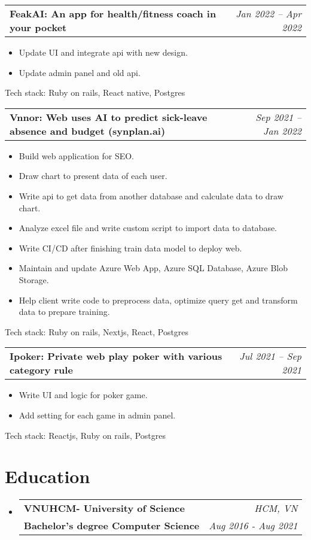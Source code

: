 \documentclass[letterpaper,11pt]{article}
\makeatletter
\newcommand{\resumeItem}[1]{
  \item\small{
    {#1 \vspace{-2pt}}
  }
}
\newcommand{\resumeSubheadingWithoutProject}[4]{
  \vspace{-2pt}\item
    \begin{tabular*}{0.97\textwidth}[t]{l@{\extracolsep{\fill}}r}
      \textbf{\Large#1} & \textit{#2} \\
      \textbf{\small#3} & \textit{\small #4} \\
    \end{tabular*}\vspace{-7pt}
}
\newcommand{\resumeSubheadingProject}[2]{
  \vspace{-2pt}\item
    \begin{tabular*}{0.97\textwidth}[t]{l@{\extracolsep{\fill}}r}
      \textbf{\small#1} & \textit{\small #2} \\
    \end{tabular*}\vspace{-7pt}
}
\newcommand{\resumeSubSubheading}[2]{
    \item
    \begin{tabular*}{0.97\textwidth}{l@{\extracolsep{\fill}}r}
      \textit{\small#1} & \textit{\small #2} \\
    \end{tabular*}\vspace{-7pt}
}
\newcommand{\resumeProjectHeading}[2]{
    \item
    \begin{tabular*}{0.97\textwidth}{l@{\extracolsep{\fill}}r}
      \small#1 & #2 \\
    \end{tabular*}\vspace{-7pt}
}
\newcommand{\resumeSubHeadingListStart}{\begin{itemize}[leftmargin=0.15in, label={}]}
\newcommand{\resumeSubHeadingListEnd}{\end{itemize}}
\newcommand{\resumeItemListStart}{\begin{itemize}}
\newcommand{\resumeItemListEnd}{\end{itemize}\vspace{-5pt}}
\makeatother
\begin{document}
\resumeSubheadingProject
{FeakAI: An app for health/fitness coach in your pocket}{Jan 2022 -- Apr 2022}
\resumeItemListStart
\resumeItem{ Update UI and integrate api with new design.}
\resumeItem{ Update admin panel and old api.}
\resumeItemListEnd
{Tech stack:}{ Ruby on rails, React native, Postgres}

\resumeSubheadingProject
{Vnnor: Web uses AI to predict sick-leave absence and budget (synplan.ai)}{Sep 2021 -- Jan 2022}
\resumeItemListStart
\resumeItem{ Build web application for SEO.}
\resumeItem{ Draw chart to present data of each user.}
\resumeItem{ Write api to get data from another database and calculate data to draw chart.}
\resumeItem{ Analyze excel file and write custom script to import data to database.}
\resumeItem{ Write CI/CD after finishing train data model to deploy web.}
\resumeItem{ Maintain and update Azure Web App, Azure SQL Database, Azure Blob Storage.}
\resumeItem{ Help client write code to preprocess data, optimize query get and transform data to prepare training.}
\resumeItemListEnd
{Tech stack:}{ Ruby on rails, Nextjs, React, Postgres}

\resumeSubheadingProject
{Ipoker: Private web play poker with various category rule}{Jul 2021 -- Sep 2021}
\resumeItemListStart
\resumeItem{ Write UI and logic for poker game.}
\resumeItem{ Add setting for each game in admin panel.}
\resumeItemListEnd
{Tech stack:}{ Reactjs, Ruby on rails, Postgres}

\section*{Education}
\resumeSubHeadingListStart
\resumeSubheadingWithoutProject
{VNUHCM- University of Science}{HCM, VN}
{Bachelor's degree Computer Science}{Aug 2016 - Aug 2021}
\resumeSubHeadingListEnd



\end{document}
